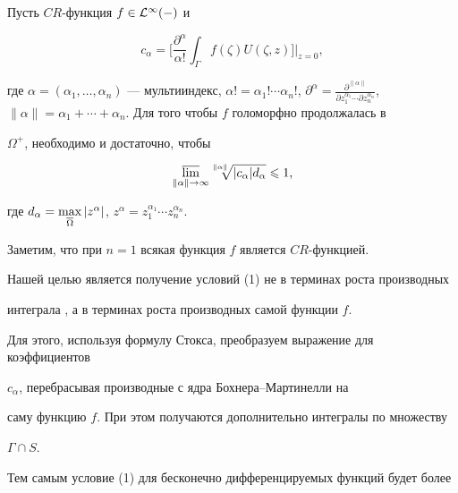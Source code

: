 \begin{thm}


Пусть $CR$-функция $f\in\cal L^1 (\Gamma)$ и


$$


c_\alpha=\bigg[\frac{\partial^\alpha}{\alpha!}\int_\Gamma


f(\zeta)U(\zeta,z)\bigg]\bigg|_{z=0},


$$


где $\alpha=(\alpha_1,\dotsc,\alpha_n)$ --- мультииндекс, $\alpha!=\alpha_1!


\dotsb\alpha_n!$, $\partial^\alpha=\frac{\partial^{\|\alpha\|}}


{\partial z_1^{\alpha_1}\dotsb\partial z_n^{\alpha_n}}$, $\|\alpha\|=


\alpha_1+\dotsb+\alpha_n$. Для того чтобы $f$ голоморфно продолжалась в


$\Omega^+$, необходимо и достаточно, чтобы


\begin{equation}


\underset{\|\alpha\|\to\infty}{\varlimsup}{}


\sqrt[\uproot{3}\|\alpha\|]{|c_\alpha|d_\alpha}


\leqslant1,


\end{equation}


где $d_\alpha=\max\limits_{\ovl\Omega}|z^\alpha|$, $z^\alpha=


z_1^{\alpha_1}\dotsb z_n^{\alpha_n}$.


\end{thm}


\noindent Заметим, что при $n=1$ всякая функция $f$ является $CR$-функцией.





Нашей целью является получение условий (1) не в терминах роста производных


интеграла \bm, а в терминах роста производных самой функции $f$.


Для этого, используя формулу Стокса, преобразуем выражение для коэффициентов


$c_{\alpha}$, перебрасывая производные с ядра Бохнера--Мар\-ти\-нел\-ли на


саму функцию $f$. При этом получаются дополнительно интегралы по множеству


$\Gamma\cap S$.


Тем самым условие (1) для бесконечно дифференцируемых функций будет более


